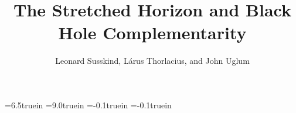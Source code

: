 


\overfullrule=0pt
\hsize=6.5truein
\vsize=9.0truein
\voffset=-0.1truein
\hoffset=-0.1truein
%
%
\def\BH{\hbox{\sevenrm bh}}
\def\half{{1\over 2}}
\def\inn{\hbox{\sevenrm in}}
\def\out{\hbox{\sevenrm out}}
\def\pa{\partial}
\def\scrip{{\cal I}^+}
\def\scrim{{\cal I}^-}
\def\scripl{{\cal I}_L^+}
\def\scripr{{\cal I}_R^+}
\def\scriml{{\cal I}_L^-}
\def\scrimr{{\cal I}_R^-}
\def\scripm{{\cal I}_{\pm}}
\def\scril{{\cal I}_L}
\def\scrir{{\cal I}_R}
\def\scripml{{\cal I}^{\pm}_L}
\def\scripmr{{\cal I}^{\pm}_R}
\def\sp{\sigma^+}
\def\sm{\sigma^-}
\def\Var{\hbox{Var}}
\def\xp{x^+}
\def\xm{x^-}
\def\yp{y^+}
\def\ym{y^-}


\vfill

\title{The Stretched Horizon and Black Hole Complementarity}

\vfill

%
%
\author{Leonard Susskind,
L\'arus Thorlacius,
and John Uglum}

\vfill

\address{Department of Physics \break Stanford University, Stanford,
CA
94305-4060}

\vfill

